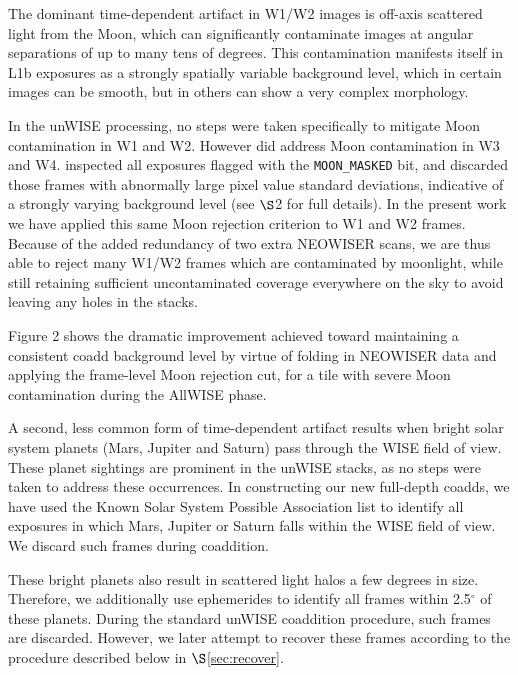 \documentclass{emulateapj}
\begin{document}
The dominant time-dependent artifact in W1/W2 images is off-axis
scattered light from the Moon, which can significantly contaminate
images at angular separations of up to many tens of degrees. This
contamination manifests itself in L1b exposures as a strongly spatially 
variable background level, which in certain images can be smooth, but in
others can show a very complex morphology.

In the \cite{lang14} unWISE processing, no steps were taken specifically
to mitigate Moon contamination in W1 and W2. However \cite{lang14} did 
address Moon contamination in W3 and W4. \cite{lang14}
inspected all exposures flagged with the \verb|MOON_MASKED| bit, and 
discarded those frames with abnormally large pixel value standard deviations,
indicative of a strongly varying background level (see \cite{lang14} $\S$2
for full details). In the present work we have applied this same
Moon rejection criterion to W1 and W2 frames. Because of the added redundancy
of two extra NEOWISER scans, we are thus able to reject many W1/W2
frames which are contaminated by moonlight, while still retaining 
sufficient uncontaminated coverage everywhere on the sky to avoid leaving
any holes in the stacks.

Figure 2 shows the dramatic improvement achieved toward maintaining a 
consistent coadd background level by virtue of folding in NEOWISER data and 
applying the frame-level Moon rejection cut, for a tile with severe Moon 
contamination during the AllWISE phase.

A second, less common form of time-dependent artifact results when
bright solar system planets (Mars, Jupiter and Saturn) pass through
the WISE field of view. These planet sightings are prominent in the 
\cite{lang14} unWISE stacks, as no steps were taken to address these
occurrences. In constructing our new full-depth coadds, we have used the Known 
Solar System Possible Association list to identify all exposures in which
Mars, Jupiter or Saturn falls within the WISE field of view. We discard
such frames during coaddition. 

These bright planets also result in scattered light halos a few degrees in size.
Therefore, we additionally use ephemerides to identify all frames within 
2.5$^{\circ}$ of these planets. During the standard unWISE coaddition procedure,
such frames are discarded. However, we later attempt to recover these
frames according to the procedure described below in $\S$\ref{sec:recover}.

\end{document}
